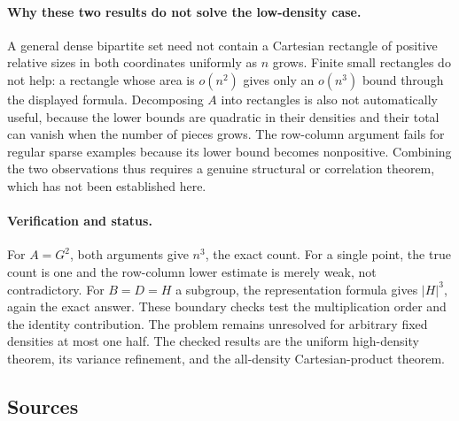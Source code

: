 \documentclass[11pt,a4paper]{article}
\begin{document}
\paragraph{Why these two results do not solve the low-density case.}
A general dense bipartite set need not contain a Cartesian rectangle of positive relative sizes in both coordinates uniformly as $n$ grows. Finite small rectangles do not help: a rectangle whose area is $o(n^2)$ gives only an $o(n^3)$ bound through the displayed formula. Decomposing $A$ into rectangles is also not automatically useful, because the lower bounds are quadratic in their densities and their total can vanish when the number of pieces grows. The row-column argument fails for regular sparse examples because its lower bound becomes nonpositive. Combining the two observations thus requires a genuine structural or correlation theorem, which has not been established here.

\paragraph{Verification and status.}
For $A=G^2$, both arguments give $n^3$, the exact count. For a single point, the true count is one and the row-column lower estimate is merely weak, not contradictory. For $B=D=H$ a subgroup, the representation formula gives $|H|^3$, again the exact answer. These boundary checks test the multiplication order and the identity contribution. The problem remains unresolved for arbitrary fixed densities at most one half. The checked results are the uniform high-density theorem, its variance refinement, and the all-density Cartesian-product theorem.

\subsection{Sources}
\end{document}
